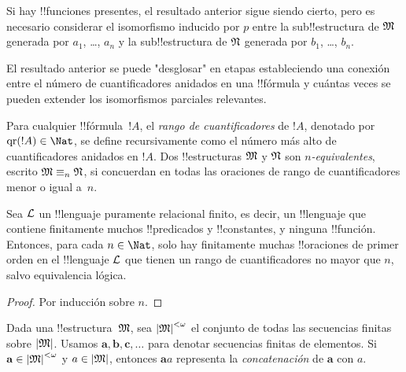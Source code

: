 \documentclass[../../../include/open-logic-section]{subfiles}
\begin{document}
\begin{rem}
Si hay !!{funciones} presentes, el resultado anterior sigue siendo cierto, pero es necesario considerar el isomorfismo inducido por $p$ entre la sub!!{estructura} de $\Struct{M}$ generada por $a_1$, \dots, $a_n$ y la sub!!{estructura} de $\Struct{N}$ generada por $b_1$, \dots, $b_n$.
\end{rem}

El resultado anterior se puede "desglosar" en etapas estableciendo una conexión entre el número de cuantificadores anidados en una !!{fórmula} y cuántas veces se pueden extender los isomorfismos parciales relevantes.

\begin{defn}
  Para cualquier !!{fórmula}~$!A$, el \emph{rango de cuantificadores} de $!A$, denotado por $\QuantRank{!A} \in \Nat$, se define recursivamente como el número más alto de cuantificadores anidados en $!A$. Dos !!{estructuras} $\Struct{M}$ y $\Struct{N}$ son \emph{$n$-equivalentes}, escrito $\Struct{M} \elemequiv[n] \Struct{N}$, si concuerdan en todas las oraciones de rango de cuantificadores menor o igual a~$n$.
\end{defn}

\begin{prop}
  Sea $\Lang{L}$ un !!{lenguaje} puramente relacional finito, es decir, un !!{lenguaje} que contiene finitamente muchos !!{predicados} y !!{constantes}, y ninguna !!{función}. Entonces, para cada $n \in \Nat$, solo hay finitamente muchas !!{oraciones} de primer orden en el !!{lenguaje} $\Lang{L}$ que tienen un rango de cuantificadores no mayor que $n$, salvo equivalencia lógica.
\end{prop}

\begin{proof}
  Por inducción sobre $n$.
\end{proof}

\begin{defn}
  Dada una !!{estructura}~$\Struct{M}$, sea $\Domain M^{<\omega}$ el conjunto de todas las secuencias finitas sobre $\Domain{M}$. Usamos $\mathbf{a}, \mathbf{b}, \mathbf{c}, \ldots$ para denotar secuencias finitas de elementos. Si $\mathbf{a} \in \Domain{M}^{<\omega}$ y $a \in \Domain{M}$, entonces $\mathbf{a}a$ representa la \emph{concatenación} de $\mathbf{a}$ con $a$.
\end{defn}
\end{document}
